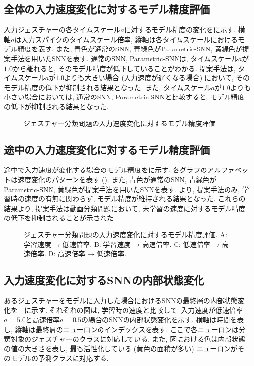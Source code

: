 \subsection{全体の入力速度変化に対するモデル精度評価}
入力ジェスチャーの各タイムスケール$a$に対するモデル精度の変化をに示す.
横軸$a$は入力スパイクのタイムスケール倍率, 縦軸は各タイムスケールにおけるモデル精度を表す.
また, 青色が通常のSNN, 青緑色がParametric-SNN, 黄緑色が提案手法を用いたSNNを表す.
通常のSNN, Parametric-SNNは, タイムスケール$a$が$1.0$から離れると, そのモデル精度が低下していることがわかる.
提案手法は, タイムスケール$a$が$1.0$よりも大きい場合 (入力速度が遅くなる場合) において, そのモデル精度の低下が抑制される結果となった.
また, タイムスケール$a$が$1.0$よりも小さい場合においては, 通常のSNN, Parametric-SNNと比較すると, モデル精度の低下が抑制される結果となった.
\begin{figure}[htb]
    \centering
    
    \caption{ジェスチャー分類問題の入力速度変化に対するモデル精度評価}
    \label{fig:result2:eval1}
\end{figure}


\subsection{途中の入力速度変化に対するモデル精度評価}
途中で入力速度が変化する場合のモデル精度をに示す.
各グラフのアルファベットは速度変化のパターンを表す ().
また, 青色が通常のSNN, 青緑色がParametric-SNN, 黄緑色が提案手法を用いたSNNを表す.
より, 提案手法のみ, 学習時の速度の有無に関わらず, モデル精度が維持される結果となった.
これらの結果より, 提案手法は動画分類問題において, 未学習の速度に対するモデル精度の低下を抑制されることが示された.
\begin{figure}[htb]
    \centering
    
    \caption[ジェスチャー分類問題の入力速度変化に対するモデル精度評価]{
        ジェスチャー分類問題の入力速度変化に対するモデル精度評価.
        A: 学習速度 → 低速倍率.
        B: 学習速度 → 高速倍率.
        C: 低速倍率 → 高速倍率.
        D: 高速倍率 → 低速倍率.    
    }
    \label{fig:result2:eval2}
\end{figure}


\subsection{入力速度変化に対するSNNの内部状態変化}
あるジェスチャーをモデルに入力した場合におけるSNNの最終層の内部状態変化を - に示す.
それぞれの図は, 学習時の速度と比較して, 入力速度が低速倍率$a=5.0$と高速倍率$a=0.5$の場合のSNNの内部状態変化を示す.
横軸は時間を表し, 縦軸は最終層のニューロンのインデックスを表す.
ここで各ニューロンは分類対象のジェスチャーのクラスに対応している.
また, 図における色は内部状態の値の大きさを表し, 最も活性化している (黄色の面積が多い) ニューロンがそのモデルの予測クラスに対応する.

